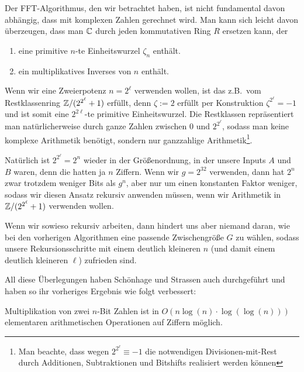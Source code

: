 \begin{remark}
    Der FFT-Algorithmus, den wir betrachtet haben, ist nicht fundamental davon abhängig, dass mit komplexen Zahlen gerechnet wird. Man kann sich leicht davon überzeugen, dass man $\mathbb{C}$ durch jeden kommutativen Ring $R$ ersetzen kann, der
    \begin{enumerate}
        \item eine primitive $n$-te Einheitswurzel $\zeta_n$ enthält.
        \item ein multiplikatives Inverses von $n$ enthält.
    \end{enumerate}

    Wenn wir eine Zweierpotenz $n=2^\ell$ verwenden wollen, ist das z.B.\ vom Restklassenring $\mathbb{Z}/(2^{2^\ell}+1)$ erfüllt, denn $\zeta:=2$ erfüllt per Konstruktion $\zeta^{2^\ell} = -1$ und ist somit eine $2^{2\ell}$-te primitive Einheitswurzel. Die Restklassen repräsentiert man natürlicherweise durch ganze Zahlen zwischen $0$ und $2^{2^\ell}$, sodass man keine komplexe Arithmetik benötigt, sondern nur ganzzahlige Arithmetik\footnote{Man beachte, dass wegen $2^{2^\ell} \equiv -1$ die notwendigen Divisionen-mit-Rest durch Additionen, Subtraktionen und Bitshifts realisiert werden können}.

    \smallskip
    Natürlich ist $2^{2^\ell}=2^n$ wieder in der Größenordnung, in der unsere Inputs $A$ und $B$ waren, denn die hatten ja $n$ Ziffern. Wenn wir $g=2^{32}$ verwenden, dann hat $2^n$ zwar trotzdem weniger Bits als $g^n$, aber nur um einen konstanten Faktor weniger, sodass wir diesen Ansatz rekursiv anwenden müssen, wenn wir Arithmetik in $\mathbb{Z}/(2^{2^\ell}+1)$ verwenden wollen.

    Wenn wir sowieso rekursiv arbeiten, dann hindert uns aber niemand daran, wie bei den vorherigen Algorithmen eine passende Zwischengröße $G$ zu wählen, sodass unsere Rekursionsschritte mit einem deutlich kleineren $n$ (und damit einem deutlich kleineren $\ell$) zufrieden sind.

    \medskip
    All diese Überlegungen haben Schönhage und Strassen auch durchgeführt und haben so ihr vorheriges Ergebnis wie folgt verbessert:
\end{remark}

\begin{theorem}
    Multiplikation von zwei $n$-Bit Zahlen ist in $O(n\log(n)\cdot\log(\log(n)))$ elementaren arithmetischen Operationen auf Ziffern möglich.
\end{theorem}


